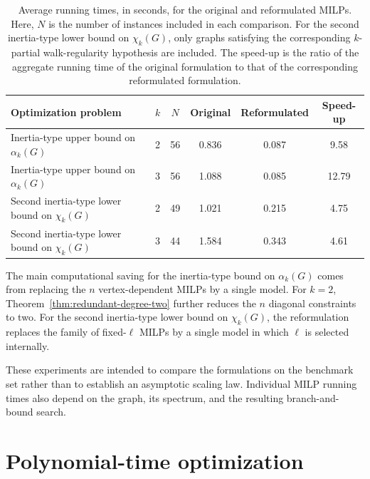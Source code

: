 \documentclass[10pt]{article}
\begin{document}
\begin{table}[t]
\centering
\small
\setlength{\tabcolsep}{4pt}
\renewcommand{\arraystretch}{1.1}
\begin{tabular}{p{5.5cm}ccccc}
\toprule
Optimization problem
& \(k\)
& \(N\)
& Original
& Reformulated
& Speed-up \\
\midrule
Inertia-type upper bound on \(\alpha_k(G)\)
& 2
& 56
& 0.836
& 0.087
& 9.58 \\
Inertia-type upper bound on \(\alpha_k(G)\)
& 3
& 56
& 1.088
& 0.085
& 12.79 \\
Second inertia-type lower bound on \(\chi_k(G)\)
& 2
& 49
& 1.021
& 0.215
& 4.75 \\
Second inertia-type lower bound on \(\chi_k(G)\)
& 3
& 44
& 1.584
& 0.343
& 4.61 \\
\bottomrule
\end{tabular}
\caption{Average running times, in seconds, for the original and
reformulated MILPs. Here, \(N\) is the number of instances included in
each comparison. For the second inertia-type lower bound on \(\chi_k(G)\),
only graphs satisfying the corresponding \(k\)-partial walk-regularity
hypothesis are included. The speed-up is the ratio of the aggregate
running time of the original formulation to that of the corresponding
reformulated formulation.}
\label{tab:milp-average-times}
\end{table}

The main computational saving for the inertia-type bound on
\(\alpha_k(G)\) comes from replacing the \(n\) vertex-dependent MILPs by
a single model. For \(k=2\), Theorem~\ref{thm:redundant-degree-two}
further reduces the \(n\) diagonal constraints to two. For the second
inertia-type lower bound on \(\chi_k(G)\), the reformulation replaces the
family of fixed-\(\ell\) MILPs by a single model in which \(\ell\) is
selected internally.

These experiments are intended to compare the formulations on the
benchmark set rather than to establish an asymptotic scaling law.
Individual MILP running times also depend on the graph, its spectrum, and
the resulting branch-and-bound search.










\section{Polynomial-time optimization}
\label{polynomial algorithm}
\end{document}
